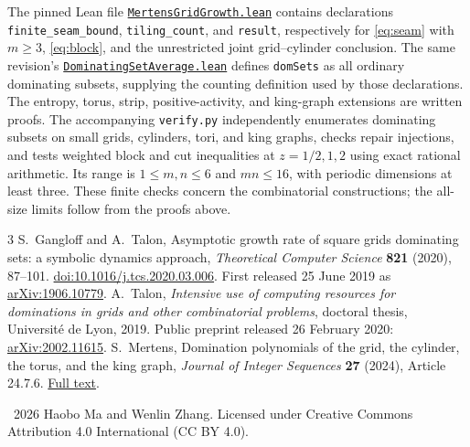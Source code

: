 \documentclass[11pt]{article}
\begin{document}
The pinned Lean file
\href{https://github.com/the-omega-institute/trureturing/blob/e277c80d045570daf43bd03b4e313f7ce457b4e2/D5/S3/Combinatorics/Graph/Domination/MertensGridGrowth.lean}{\texttt{MertensGridGrowth.lean}}
contains declarations \texttt{finite\_seam\_bound}, \texttt{tiling\_count},
and \texttt{result}, respectively for \eqref{eq:seam} with $m\ge3$,
\eqref{eq:block}, and the unrestricted joint grid--cylinder conclusion.
The same revision's
\href{https://github.com/the-omega-institute/trureturing/blob/e277c80d045570daf43bd03b4e313f7ce457b4e2/D5/S3/Combinatorics/Graph/DominatingSetAverage.lean}{\texttt{DominatingSetAverage.lean}}
defines \texttt{domSets} as all ordinary dominating subsets, supplying
the counting definition used by those declarations.
The entropy, torus, strip, positive-activity, and king-graph extensions
are written proofs. The accompanying \texttt{verify.py} independently
enumerates dominating subsets on small grids, cylinders, tori, and king
graphs, checks repair injections, and tests weighted block and cut
inequalities at $z=1/2,1,2$ using exact rational arithmetic. Its range is
$1\le m,n\le6$ and $mn\le16$, with periodic dimensions at least three.
These finite checks concern the combinatorial constructions; the all-size
limits follow from the proofs above.

\begin{thebibliography}{3}
S.~Gangloff and A.~Talon, Asymptotic growth rate of square grids dominating
sets: a symbolic dynamics approach, \emph{Theoretical Computer Science}
\textbf{821} (2020), 87--101.
\href{https://doi.org/10.1016/j.tcs.2020.03.006}{doi:10.1016/j.tcs.2020.03.006}.
First released 25 June 2019 as
\href{https://arxiv.org/abs/1906.10779}{arXiv:1906.10779}.
A.~Talon, \emph{Intensive use of computing resources for dominations in
grids and other combinatorial problems}, doctoral thesis, Universit\'e
de Lyon, 2019. Public preprint released 26 February 2020:
\href{https://arxiv.org/abs/2002.11615}{arXiv:2002.11615}.
S.~Mertens, Domination polynomials of the grid, the cylinder, the torus,
and the king graph, \emph{Journal of Integer Sequences} \textbf{27}
(2024), Article 24.7.6.
\href{https://cs.uwaterloo.ca/journals/JIS/VOL27/Mertens2/mertens12.pdf}{Full text}.
\end{thebibliography}

\noindent\small\textcopyright\ 2026 Haobo Ma and Wenlin Zhang.
Licensed under Creative Commons Attribution 4.0 International (CC BY 4.0).
\end{document}
